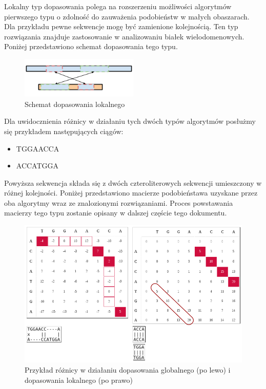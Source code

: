 \documentclass[a4paper,12pt]{article}
\newenvironment{lista}{
\begin{itemize}
  \setlength{\itemsep}{1pt}
  \setlength{\parskip}{0pt}
  \setlength{\parsep}{0pt}
}{\end{itemize}}
\begin{document}
Lokalny typ dopasowania polega na rozszerzeniu możliwości algorytmów pierwszego typu o zdolność do zauważenia podobieństw w małych obaszarach. Dla przykładu pewne sekwencje mogę być zamienione kolejnością. Ten typ rozwiązania znajduje zastosowanie w analizowaniu białek wielodomenowych.  Poniżej przedstawiono schemat dopasowania tego typu. 

\begin{figure}[H]
  \vspace{5pt}
  \centering
  \begin{center}
  \includegraphics[width=0.5\textwidth]{images/Dopasowanie_lokalne.png}
  \end{center}
  \caption{Schemat dopasowania lokalnego}
 \end{figure}
 
 
Dla uwidocznienia różnicy w działaniu tych dwóch typów algorytmów posłużmy się przykładem następujących ciągów:
\begin{lista}
 \item TGGAACCA
\item ACCATGGA
\end{lista}

Powyższa sekwencja składa się z dwóch czteroliterowych sekwencji umieszczony w różnej kolejności. Poniżej przedstawiono macierze podobieństawa uzyskane przez oba algorytmy wraz ze znalozionymi rozwiązaniami. Proces powstawania macierzy tego typu zostanie opisany w dalszej częście tego dokumentu. 


\begin{figure}[H]
  \vspace{5pt}
  \centering
  \begin{center}
  \includegraphics[width=1.0\textwidth]{images/Globalne_lokalne_przyklad.png}
  \end{center}
  \caption{Przykład różnicy w działaniu dopasowania globalnego (po lewo) i dopasowania lokalnego (po prawo)}
 \end{figure}
\end{document}
